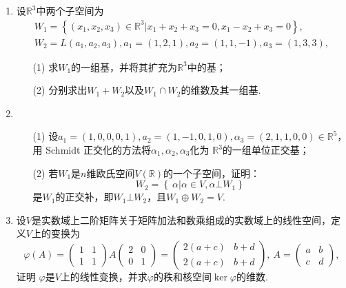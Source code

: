\begin{enumerate}
    \item 设\(\mathbb{R}^3\)中两个子空间为
          \begin{align*}
              W_1 = \left\{ \left( x_1,x_2,x_3 \right) \in \mathbb{R}^3 | x_1 + x_2 + x_3 = 0,x_1 - x_2 + x_3 = 0 \right\}, \\
              W_2 = L\left( a_1,a_2,a_3 \right),a_1 = (1,2,1),a_2 = (1,1, - 1),a_3 = (1,3,3),
          \end{align*}
          \begin{enumerate}
              \item[(1)] 求\(W_1\)的一组基，并将其扩充为\(\mathbb{R}^3\)中的基；
              \item[(2)] 分别求出\(W_1 + W_2\)以及\(W_1 \cap W_2\)的维数及其一组基.
          \end{enumerate}

    \item
          \begin{enumerate}
              \item[(1)] 设\(a_1 = (1,0,0,0,1),a_2 = (1, - 1,0,1,0),\alpha_3 = (2,1,1,0,0) \in \mathbb{R}^{5}\)，用
                    Schmidt 正交化的方法将\(\alpha_1,\alpha_2,\alpha_3\)化为
                    \(\mathbb{R}^3\)的一组单位正交基；
              \item[(2)] 若\(W_1\)是\(n\)维欧氏空间\(V\left( \mathbb{R} \right)\)的一个子空间，证明：
                    \[W_2 = \left\{ \left. \ \alpha \right|\alpha \in V,\alpha\bot W_1 \right\}\]
                    是\(W_1\)的正交补，即\(W_1\bot W_2\)，且\(W_1 \oplus W_2 = V\).
          \end{enumerate}

    \item 设\(V\)是实数域上二阶矩阵关于矩阵加法和数乘组成的实数域上的线性空间，定义\(V\)上的变换为
          \[\varphi(A) =
              \begin{pmatrix}
                  1 & 1 \\
                  1 & 1
              \end{pmatrix} A \begin{pmatrix}
                  2 & 0 \\
                  0 & 1
              \end{pmatrix} = \begin{pmatrix}
                  2(a + c) & b + d \\
                  2(a + c) & b + d
              \end{pmatrix},\ A = \begin{pmatrix}
                  a & b \\
                  c & d
              \end{pmatrix},\]
          证明 \(\varphi\)是\(V\)上的线性变换，并求\(\varphi\)的秩和核空间\(\ker\varphi\)的维数.



\end{enumerate}
